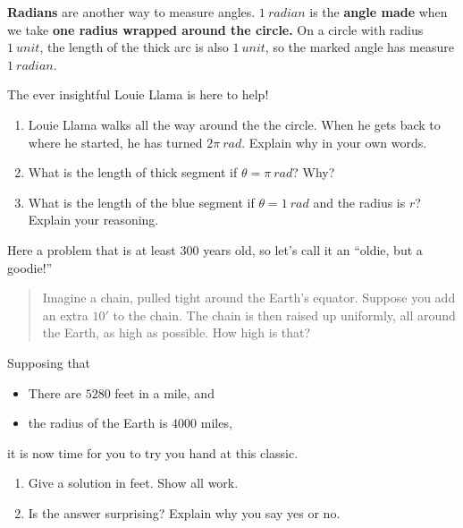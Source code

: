 \documentclass[noauthor,nooutcomes,handout]{ximera}
\begin{document}
\begin{question}
\textbf{Radians} are another way to measure angles. $1 \ radian$ is
the \textbf{angle made} when we take \textbf{one radius wrapped around the
circle.} On a circle with radius $1\ unit$, the length of the thick arc
is also $1\ unit$, so the marked angle has measure $1 \ radian$.


\begin{center}
 
\end{center}

The ever insightful Louie Llama is here to help!

\begin{enumerate}
    \item Louie Llama walks all the way around the  the circle. When he gets back to where he started, he has turned $2\pi \ rad$. Explain why in your own words. 
    \item What is the length of thick segment if $\theta=\pi \ rad$? Why?
    \item What is the length of the blue segment if $\theta=1 \ rad$ and the radius is $r$? Explain your reasoning.
\end{enumerate}
\end{question}
\mynewpage

\begin{question} %
  Here a problem that is at least $300$ years old, so let's call it an  ``oldie, but a goodie!''
  \begin{quote}
    Imagine a chain, pulled tight around the Earth's equator. Suppose
    you add an extra $10'$ to the chain. The chain is then raised up
    uniformly, all around the Earth, as high as possible. How high is
    that?
  \end{quote}
  Supposing that
  \begin{itemize}
  \item There are $5280$ feet in a mile, and
  \item the radius of the Earth is $4000$ miles,
  \end{itemize}
  it is now time for you to try you hand at this classic.
  \begin{enumerate}
  \item Give a solution in feet. Show all work.
  \item Is the answer surprising? Explain why you say yes or no.
  \end{enumerate}
\end{question}
\end{document}
